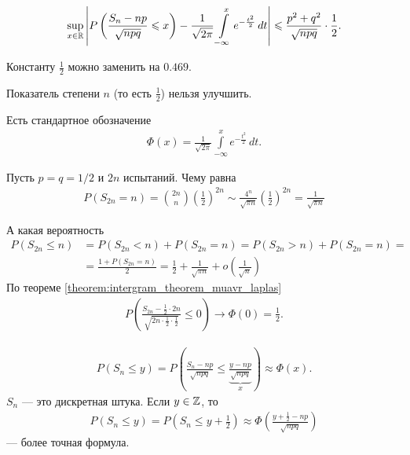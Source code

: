 \documentclass[../main.tex]{subfiles}
\begin{document}
\begin{thm}
 \begin{align*}
  \sup_{x \in \mathbb{R}} \left| P \left( \frac{S_n - np}{\sqrt{npq}} \leqslant x \right) - \frac{1}{\sqrt{2\pi}} \int\limits_{-\infty}^{x} e^{-\frac{t^{2}}{2}}\, dt \right| \leqslant \frac{p^{2}+q^{2}}{\sqrt{npq}} \cdot \frac{1}{2}
 .\end{align*}
\end{thm}

\begin{remrk*}
 Константу $\frac{1}{2}$ можно заменить на $0.469$.
\end{remrk*}

\begin{remrk*}
 Показатель степени $n$ (то есть $\frac{1}{2}$) нельзя улучшить.
\end{remrk*}

\begin{notatn*}
 Есть стандартное обозначение
 \begin{align*}
  \Phi(x) = \frac{1}{\sqrt{2\pi}} \int\limits_{-\infty}^{x} e^{-\frac{t^{2}}{2}}\,dt
 .\end{align*} 
\end{notatn*}

\begin{exmpl*}
 Пусть $p = q = 1 / 2$ и  $2n$ испытаний. Чему равна
 \begin{align*}
  P(S_{2n} = n) = \binom {2n} n \left( \frac{1}{2} \right)^{2n} \sim \frac{4^{n}}{\sqrt{\pi n}} \left( \frac{1}{2} \right)^{2n} = \frac{1}{\sqrt{\pi n}}
 \end{align*} 

 А какая вероятность
 \begin{align*}
  P(S_{2n} \leqslant n) &= P(S_{2n} < n) + P(S_{2n} = n) = P(S_{2n} > n) + P(S_{2n} = n) = \\
  &= \frac{1 + P(S_{2n} = n)}{2} = \frac{1}{2} + \frac{1}{\sqrt{\pi n}} + o \left( \frac{1}{\sqrt{n}} \right)
 \end{align*} По теореме \ref{theorem:intergram_theorem_muavr_laplas}
 \begin{align*}
  P\left(\frac{S_{2n} - \frac{1}{2} \cdot 2n}{\sqrt{2n \cdot \frac{1}{2} \cdot \frac{1}{2}}} \leqslant 0\right) \to \Phi(0) = \frac{1}{2}.
 \end{align*} 
\end{exmpl*}

\begin{remrk*}
 \begin{align*}
  P(S_n \leqslant y) = P\left(\frac{S_n - np}{\sqrt{npq}} \leqslant \underbrace{\frac{y - np}{\sqrt{npq}}}_{x}\right) \approx \Phi(x)
 .\end{align*} $S_n$ --- это дискретная штука. Если  $y \in \mathbb{Z}$, то
 \begin{align*}
  P(S_n \leqslant y) = P\left(S_n \leqslant y + \frac{1}{2}\right) \approx \Phi \left( \frac{y + \frac{1}{2} - np}{\sqrt{npq}} \right)
 \end{align*} --- более точная формула.
\end{remrk*}
\end{document}
